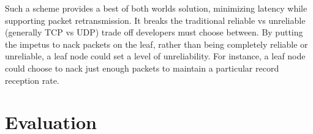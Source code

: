 Such a scheme provides a best of both worlds solution, minimizing latency while
supporting packet retransmission.  It breaks the
traditional reliable vs unreliable (generally TCP vs UDP) trade off developers
must choose between.  By putting the impetus to nack packets on the leaf, rather
than being completely reliable or unreliable, a leaf node could set a level of
unreliability.  For instance, a leaf node could choose to nack just enough
packets to maintain a particular record reception rate.


\section{Evaluation}

